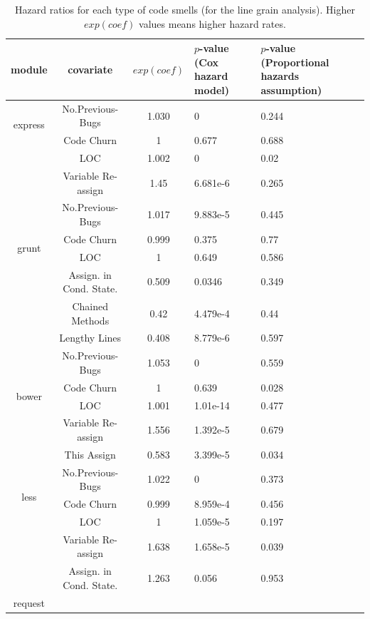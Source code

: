 \documentclass[smallcondensed]{svjour3}
\begin{document}
\begin{table}[t]
	\centering
	\scriptsize
	\caption{Hazard ratios for each type of code smells (for the line grain analysis). Higher $exp(coef)$ values means higher hazard rates.}
	\begin{tabular}{c|c|c|p{1.1cm}|p{1.3cm}}
		\hline
		module & covariate & $exp(coef)$ & $p$-value (Cox hazard model) & $p$-value (Proportional hazards assumption) \\ \hline
		\multirow{2}{*}{express}
		& No.Previous-Bugs & 1.030 & 0 & 0.244 \\ \cline{2-5}
		& Code Churn & 1 & 0.677 & 0.688 \\ \cline{2-5}
		& LOC & 1.002 & 0 & 0.02 \\ \cline{2-5}
		& Variable Re-assign & 1.45 & 6.681e-6 & 0.265  \\ \hline
		\multirow{4}{*}{grunt}
		& No.Previous-Bugs & 1.017 & 9.883e-5 & 0.445 \\ \cline{2-5}
		& Code Churn & 0.999 & 0.375 & 0.77 \\ \cline{2-5}
		& LOC & 1 & 0.649 & 0.586 \\ \cline{2-5}
		& Assign. in Cond. State. & 0.509 & 0.0346 & 0.349 \\ \cline{2-5}
		& Chained Methods & 0.42 & 4.479e-4 & 0.44 \\ \cline{2-5}
		& Lengthy Lines & 0.408 & 8.779e-6 & 0.597 \\ \hline
		\multirow{4}{*}{bower}
		& No.Previous-Bugs & 1.053 & 0 & 0.559 \\ \cline{2-5}
		& Code Churn & 1 & 0.639 & 0.028 \\ \cline{2-5}
		& LOC & 1.001 & 1.01e-14 & 0.477 \\ \cline{2-5}
		& Variable Re-assign & 1.556 & 1.392e-5 & 0.679 \\ \cline{2-5}
		& This Assign & 0.583 & 3.399e-5 & 0.034 \\ \hline
		\multirow{3}{*}{less}
		& No.Previous-Bugs & 1.022 & 0 & 0.373 \\ \cline{2-5}
		& Code Churn & 0.999 & 8.959e-4 & 0.456 \\ \cline{2-5}
		& LOC & 1 & 1.059e-5 & 0.197 \\ \cline{2-5}
		& Variable Re-assign & 1.638 & 1.658e-5 & 0.039 \\ \cline{2-5}
		& Assign. in Cond. State. & 1.263 & 0.056 & 0.953 \\ \hline
		\multirow{3}{*}{request}

\end{tabular}
\end{table}
\end{document}
